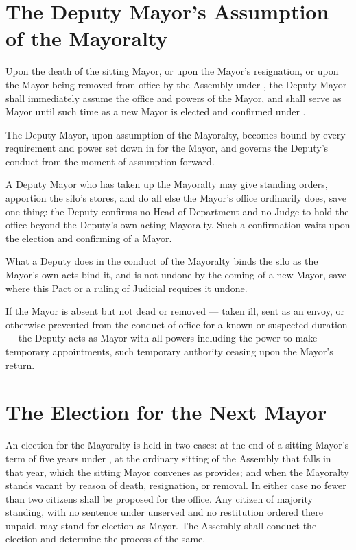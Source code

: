 \section{The Deputy Mayor's Assumption of the Mayoralty}
\label{sec:succession:deputy-mayors-assumption-of-the-mayoralty}

Upon the death of the sitting Mayor, or upon the Mayor's resignation, or upon the Mayor being removed from office by the Assembly under , the Deputy Mayor shall immediately assume the office and powers of the Mayor, and shall serve as Mayor until such time as a new Mayor is elected and confirmed under .

\begin{clauses}
\item The Deputy Mayor, upon assumption of the Mayoralty, becomes bound by every requirement and power set down in  for the Mayor, and  governs the Deputy's conduct from the moment of assumption forward.
\item A Deputy Mayor who has taken up the Mayoralty may give standing orders, apportion the silo's stores, and do all else the Mayor's office ordinarily does, save one thing: the Deputy confirms no Head of Department and no Judge to hold the office beyond the Deputy's own acting Mayoralty. Such a confirmation waits upon the election and confirming of a Mayor.
\item What a Deputy does in the conduct of the Mayoralty binds the silo as the Mayor's own acts bind it, and is not undone by the coming of a new Mayor, save where this Pact or a ruling of Judicial requires it undone.
\item If the Mayor is absent but not dead or removed --- taken ill, sent as an envoy, or otherwise prevented from the conduct of office for a known or suspected duration --- the Deputy acts as Mayor with all powers including the power to make temporary appointments, such temporary authority ceasing upon the Mayor's return.
\end{clauses}

\section{The Election for the Next Mayor}
\label{sec:succession:election-for-the-next-mayor}

An election for the Mayoralty is held in two cases: at the end of a sitting Mayor's term of five years under , at the ordinary sitting of the Assembly that falls in that year, which the sitting Mayor convenes as  provides; and when the Mayoralty stands vacant by reason of death, resignation, or removal. In either case no fewer than two citizens shall be proposed for the office. Any citizen of majority standing, with no sentence under  unserved and no restitution ordered there unpaid, may stand for election as Mayor. The Assembly shall conduct the election and determine the process of the same.

